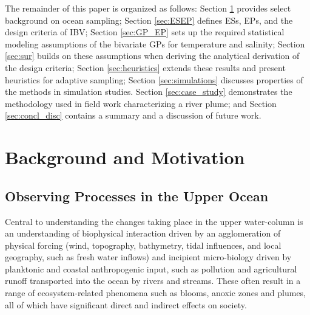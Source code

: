 \documentclass[aoas]{imsart}
\begin{document}
The remainder of this paper is organized as follows: Section
\ref{sec:bg} provides select background on ocean sampling; Section
\ref{sec:ESEP} defines ESs, EPs, and the design criteria of IBV;
Section \ref{sec:GP_EP} sets up the required statistical modeling
assumptions of the bivariate GPs for temperature and salinity;
Section \ref{sec:sur} builds on these assumptions when deriving the
analytical derivation of the design criteria; Section
\ref{sec:heuristics} extends these results and present heuristics for
adaptive sampling; Section \ref{sec:simulations}
discusses properties of the methods in simulation studies. Section
\ref{sec:case_study} demonstrates the methodology used in field work
characterizing a river plume; and Section \ref{sec:concl_disc}
contains a summary and a discussion of future work.


\section{Background and Motivation}\label{sec:bg}


\subsection{Observing Processes in the Upper Ocean}


Central to understanding the changes taking place in the upper
water-column is an understanding of biophysical interaction driven by
an agglomeration of physical forcing (wind, topography, bathymetry,
tidal influences, and local geography, such as fresh water inflows) and
incipient micro-biology driven by planktonic and coastal anthropogenic
input, such as pollution and agricultural runoff transported into the ocean by rivers and streams. These often result in a range of ecosystem-related phenomena such as blooms, anoxic zones and plumes, all of which have significant direct and indirect effects on society.
\end{document}
